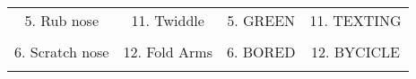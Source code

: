 \begin{center}
\begin{supertabular*}{\textwidth}{cccc}
     5.  Rub nose  & 11. Twiddle  & 5.    GREEN & 11. TEXTING \\
     &  &  &  \\
    
     6.  Scratch nose  & 12. Fold Arms     & 6.    BORED & 12.   BYCICLE \\
     &  &  &  \\
      \hline \end{supertabular*} 
  \end{center} 